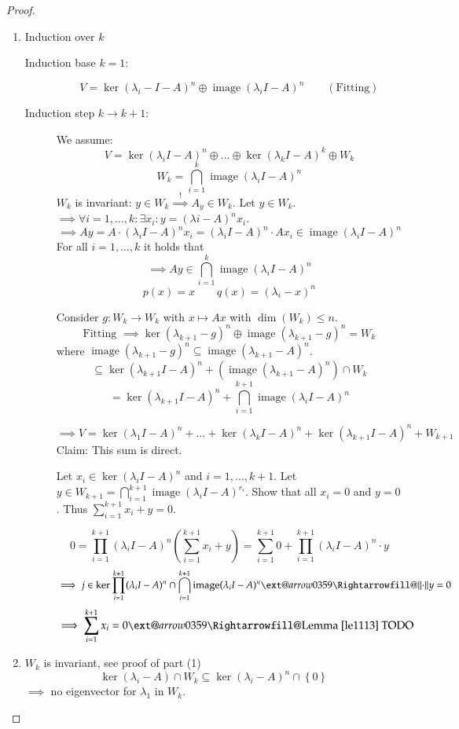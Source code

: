 \documentclass{article}
\makeatletter
\newcommand{\set}[1]{\left\{#1\right\}}
\newcommand{\norm}[1]{\left\|#1\right\|}
\newcommand{\xRightarrow}[2][]{\ext@arrow 0359\Rightarrowfill@{#1}{#2}}
\DeclareMathOperator{\im}{image}
\makeatother
\begin{document}
\begin{proof}
  \begin{enumerate}
    \item Induction over $k$
      \begin{description}
        \item[Induction base $k=1$:] 
          \[ V = \ker(\lambda_i - I - A)^n \oplus \im(\lambda_i I - A)^n \qquad (\text{Fitting}) \]
        \item[Induction step $k \to k+1$:]
          We assume:
          \[ V = \ker(\lambda_i I - A)^n \oplus \dots \oplus \ker(\lambda_k I - A)^k \oplus W_k \]
          \[ W_k = \bigcap_{i=1}^k \im(\lambda_i I - A)^n \]
          $W_k$ is invariant: $y \in W_k \overset!\implies A_y \in W_k$.
          Let $y \in W_k$. $\implies \forall i = 1, \dots, k: \exists x_i: y = (\lambda i - A)^n x_i$.
          \[ \implies Ay = A \cdot (\lambda_i I - A)^n x_i = (\lambda_i I - A)^n \cdot Ax_i \in \im(\lambda_i I - A)^n \]
          For all $i = 1,\dots,k$ it holds that
          \[ \implies Ay \in \bigcap_{i=1}^k \im(\lambda_i I - A)^n \]
          \[ p(x) = x \qquad q(x) = (\lambda_i - x)^n \]

          Consider $g: W_k \to W_k$ with $x \mapsto Ax$ with $\dim(W_k) \leq n$.
          \[ \text{Fitting } \implies \ker(\lambda_{k+1} - g)^n \oplus \im(\lambda_{k+1} - g)^n = W_k \]
          where $\im(\lambda_{k+1} - g)^n \subseteq \im(\lambda_{k+1} - A)^n$.
          \[ \subseteq \ker(\lambda_{k+1} I - A)^n + (\im(\lambda_{k+1} - A)^n) \cap W_k \]
          \[ = \ker(\lambda_{k+1} I - A)^n + \bigcap_{i=1}^{k+1} \im(\lambda_i I - A)^n \]

          \[ \implies V = \ker(\lambda_1 I - A)^n + \dots + \ker(\lambda_k I - A)^n + \ker(\lambda_{k+1} I - A)^n + W_{k+1} \]
          Claim: This sum is direct.

          Let $x_i \in \ker(\lambda_i I - A)^n$ and $i=1,\dots,k+1$.
          Let $y \in W_{k+1} = \bigcap_{i=1}^{k+1} \im(\lambda_i I - A)^{r_i}$.
          Show that all $x_i = 0$ and $y = 0$. Thus $\sum_{i=1}^{k+1} x_i + y = 0$.

          \[ 0 = \prod_{i=1}^{k+1} (\lambda_i I - A)^n \left(\sum_{i=1}^{k+1} x_i + y\right) = \sum_{i=1}^{k+1} 0 + \prod_{i=1}^{k+1} (\lambda_i I - A)^n \cdot y \]
          \[ \implies j \in \ker{\prod_{i=1}^{k+1} (\lambda_i I - A)^n \cap \bigcap_{i=1}^{k+1} \im(\lambda_i I - A)^n} \xRightarrow{\norm{\cdot}} y = 0 \]
          \[ \implies \sum_{i=1}^{k+1} x_i = 0 \xRightarrow{\text{Lemma~\ref{le1113}}} \text{ TODO} \]
      \end{description}
    \item
      $W_k$ is invariant, see proof of part (1)
      \[ \ker(\lambda_i - A) \cap W_k \subseteq \ker(\lambda_i - A)^n \cap \set{0} \]
      $\implies$ no eigenvector for $\lambda_1$ in $W_k$.
  \end{enumerate}
\end{proof}
\end{document}
